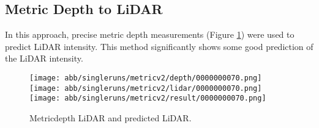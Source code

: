 \subsection{Metric Depth to LiDAR}

In this approach, precise metric depth measurements (Figure \ref{metric_results}) were used to predict LiDAR intensity. This method significantly shows some good prediction of the LiDAR intensity.
\begin{figure}[!ht]
	\centering
	\texttt{[image: abb/singleruns/metricv2/depth/0000000070.png]}
	\texttt{[image: abb/singleruns/metricv2/lidar/0000000070.png]}
	\texttt{[image: abb/singleruns/metricv2/result/0000000070.png]}
	\caption{Metricdepth LiDAR and predicted LiDAR.}
	\label{metric_results}
\end{figure}
\newpage	
